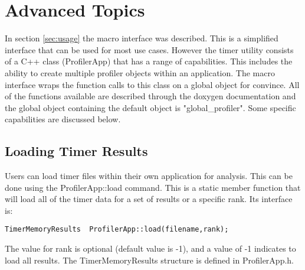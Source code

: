 \documentclass[fleqn,10pt,letterpaper]{article}
\begin{document}
\section{Advanced Topics}  \label{sec:advanced}

In section \ref{sec:usage} the macro interface was described.  This is a simplified
interface that can be used for most use cases.  However the timer utility consists
of a C++ class (ProfilerApp) that has a range of capabilities.  This includes the
ability to create multiple profiler objects within an application.  The macro interface
wraps the function calls to this class on a global object for convince.  All of 
the functions available are described through the doxygen documentation and the global
object containing the default object is "global\_profiler".  Some specific capabilities 
are discussed below.

\subsection{Loading Timer Results}

Users can load timer files within their own application for analysis.  This can
be done using the ProfilerApp::load command.  This is a static member function
that will load all of the timer data for a set of results or a specific rank.  
Its interface is:
\begin{Verbatim}[fontsize=\normal,baselinestretch=1.0]
    TimerMemoryResults  ProfilerApp::load(filename,rank);
\end{Verbatim}
The value for rank is optional (default value is -1), and a value of -1 indicates to
load all results.  
The TimerMemoryResults structure is defined in ProfilerApp.h.  




\end{document}
